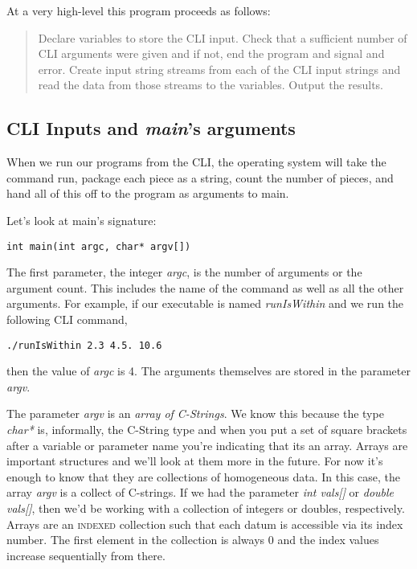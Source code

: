 \documentclass[]{tufte-handout}
\begin{document}
At a very high-level this program proceeds as follows:
\begin{quote}
Declare variables to store the CLI input. Check that a sufficient number of CLI arguments were given and if not, end the program and signal and error. Create input string streams from each of the CLI input strings and read the data from those streams to the variables. Output the results.
\end{quote}

\subsection{CLI Inputs and \textit{main}'s arguments}

When we run our programs from the CLI, the operating system will take the command run, package each piece as a string, count the number of pieces, and hand all of this off to the program as arguments to main. 

Let's look at main's signature:
\begin{verbatim}
int main(int argc, char* argv[])
\end{verbatim}
The first parameter, the integer \textit{argc}, is the number of arguments or the argument count. This includes the name of the command as well as all the other arguments. For example, if our executable is named \textit{runIsWithin} and we run the following CLI command,
\begin{verbatim}
./runIsWithin 2.3 4.5. 10.6
\end{verbatim}
then the value of \textit{argc} is 4. The arguments themselves are stored in the parameter \textit{argv}.

The parameter \textit{argv} is an \textit{array of C-Strings}. We know this because the type \textit{char*} is, informally, the C-String type and when you put a set of square brackets after a variable or parameter name you're indicating that its an array. Arrays are important structures and we'll look at them more in the future. For now it's enough to know that they are collections of homogeneous data. In this case, the array \textit{argv} is a collect of C-strings. If we had the parameter \textit{int vals[]} or \textit{double vals[]}, then we'd be working with a collection of integers or doubles, respectively. Arrays are an \textsc{indexed} collection such that each datum is accessible via its index number. The first element in the collection is always 0 and the index values increase sequentially from there. 
\end{document}
